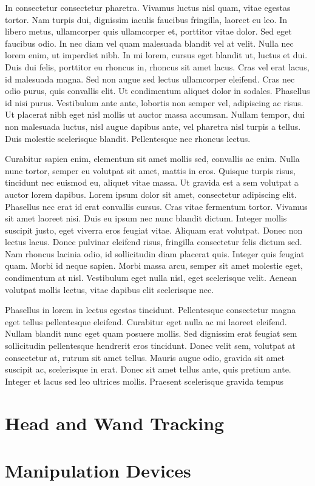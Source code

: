 In consectetur consectetur pharetra. Vivamus luctus nisl quam, vitae
egestas tortor. Nam turpis dui, dignissim iaculis faucibus fringilla,
laoreet eu leo. In libero metus, ullamcorper quis ullamcorper et,
porttitor vitae dolor. Sed eget faucibus odio. In nec diam vel quam
malesuada blandit vel at velit. Nulla nec lorem enim, ut imperdiet
nibh. In mi lorem, cursus eget blandit ut, luctus et dui. Duis dui
felis, porttitor eu rhoncus in, rhoncus sit amet lacus. Cras vel erat
lacus, id malesuada magna. Sed non augue sed lectus ullamcorper
eleifend. Cras nec odio purus, quis convallis elit. Ut condimentum
aliquet dolor in sodales. Phasellus id nisi purus. Vestibulum ante ante,
lobortis non semper vel, adipiscing ac risus. Ut placerat nibh eget nisl
mollis ut auctor massa accumsan. Nullam tempor, dui non malesuada
luctus, nisl augue dapibus ante, vel pharetra nisl turpis a tellus. Duis
molestie scelerisque blandit. Pellentesque nec rhoncus lectus.

Curabitur sapien enim, elementum sit amet mollis sed, convallis ac
enim. Nulla nunc tortor, semper eu volutpat sit amet, mattis in
eros. Quisque turpis risus, tincidunt nec euismod eu, aliquet vitae
massa. Ut gravida est a sem volutpat a auctor lorem dapibus. Lorem ipsum
dolor sit amet, consectetur adipiscing elit. Phasellus nec erat id erat
convallis cursus. Cras vitae fermentum tortor. Vivamus sit amet laoreet
nisi. Duis eu ipsum nec nunc blandit dictum. Integer mollis suscipit
justo, eget viverra eros feugiat vitae. Aliquam erat volutpat. Donec non
lectus lacus. Donec pulvinar eleifend risus, fringilla consectetur felis
dictum sed. Nam rhoncus lacinia odio, id sollicitudin diam placerat
quis. Integer quis feugiat quam. Morbi id neque sapien. Morbi massa
arcu, semper sit amet molestie eget, condimentum at nisl. Vestibulum
eget nulla nisl, eget scelerisque velit. Aenean volutpat mollis lectus,
vitae dapibus elit scelerisque nec.

  Phasellus in lorem in lectus egestas tincidunt. Pellentesque
  consectetur magna eget tellus pellentesque eleifend. Curabitur eget
  nulla ac mi laoreet eleifend. Nullam blandit nunc eget quam posuere
  mollis. Sed dignissim erat feugiat sem sollicitudin pellentesque
  hendrerit eros tincidunt. Donec velit sem, volutpat at consectetur at,
  rutrum sit amet tellus. Mauris augue odio, gravida sit amet suscipit
  ac, scelerisque in erat. Donec sit amet tellus ante, quis pretium
  ante. Integer et lacus sed leo ultrices mollis. Praesent scelerisque
  gravida tempus
\section{Head and Wand Tracking}
\section{Manipulation Devices}